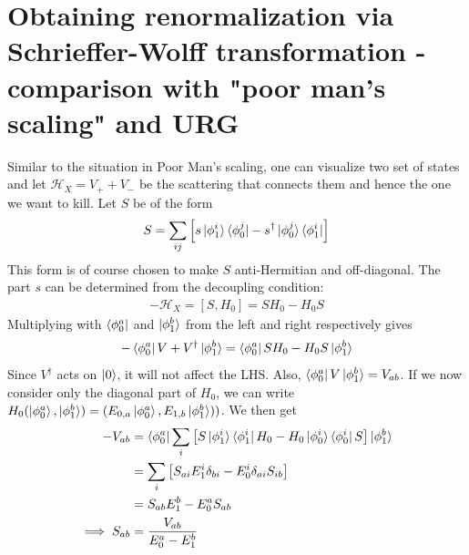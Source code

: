 \documentclass[twoside,11pt]{report}
\numberwithin{equation}{section}
\begin{document}
\section{Obtaining renormalization via Schrieffer-Wolff transformation - comparison with "poor man's scaling" and URG}
Similar to the situation in Poor Man's scaling, one can visualize two set of states and let \(\mathcal{H}_X = V_+ + V_-\) be the scattering that connects them and hence the one we want to kill. Let \(S\) be of the form 
\begin{equation}\begin{aligned}
	S = \sum_{ij}\left[s\ket{\phi_1^i}\bra{\phi_0^j} - s^\dagger\ket{\phi_0^j}\bra{\phi_1^i}\right]
\end{aligned}\end{equation}
This form is of course chosen to make \(S\) anti-Hermitian and off-diagonal. The part \(s\) can be determined from the decoupling condition:
\begin{equation}\begin{aligned}
	-\mathcal{H}_X = \left[S, H_0\right] = S H_0 - H_0 S
\end{aligned}\end{equation}
Multiplying with \(\bra{\phi_0^a}\) and \(\ket{\phi_1^b}\) from the left and right respectively gives
\begin{equation}\begin{aligned}
-\bra{\phi_0^a}V + V^\dagger\ket{\phi_1^b} &= \bra{\phi_0^a}S H_0 - H_0 S\ket{\phi_1^b}\\
\end{aligned}\end{equation}
Since \(V^\dagger\) acts on \(\ket{0}\), it will not affect the LHS. Also, \(\bra{\phi_0^a}V\ket{\phi_1^b} = V_{ab}\). If we now consider only the diagonal part of \(H_0\), we can write \(H_0 (\ket{\phi_0^a},\ket{\phi_1^b}) = (E_{0,a}\ket{\phi_0^a},E_{1,b}\ket{\phi_1^b}))\). We then get
\begin{equation}\begin{aligned}
	-V_{ab} &= \bra{\phi_0^a}\sum_i\left[S\ket{\phi_1^i}\bra{\phi_1^i} H_0 - H_0 \ket{\phi_0^i}\bra{\phi_0^i}S\right]\ket{\phi_1^b}\\
		&= \sum_i\left[S_{ai}E_1^i \delta_{bi} - E^i_0 \delta_{ai}S_{ib}\right]\\
    &= S_{ab}E_1^b  - E^a_0 S_{ab}\\
\implies S_{ab} &= \frac{V_{ab}}{E_0^a - E_1^b}
\end{aligned}\end{equation}
\end{document}
